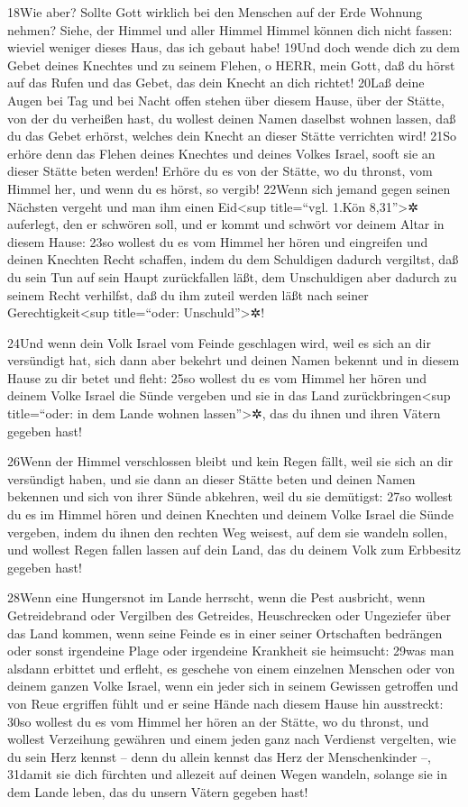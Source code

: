 18Wie aber? Sollte Gott wirklich bei den Menschen auf der Erde Wohnung
nehmen? Siehe, der Himmel und aller Himmel Himmel können dich nicht
fassen: wieviel weniger dieses Haus, das ich gebaut habe! 19Und doch
wende dich zu dem Gebet deines Knechtes und zu seinem Flehen, o HERR,
mein Gott, daß du hörst auf das Rufen und das Gebet, das dein Knecht an
dich richtet! 20Laß deine Augen bei Tag und bei Nacht offen stehen über
diesem Hause, über der Stätte, von der du verheißen hast, du wollest
deinen Namen daselbst wohnen lassen, daß du das Gebet erhörst, welches
dein Knecht an dieser Stätte verrichten wird! 21So erhöre denn das
Flehen deines Knechtes und deines Volkes Israel, sooft sie an dieser
Stätte beten werden! Erhöre du es von der Stätte, wo du thronst, vom
Himmel her, und wenn du es hörst, so vergib! 22Wenn sich jemand gegen
seinen Nächsten vergeht und man ihm einen Eid\textless sup title=``vgl.
1.Kön 8,31''\textgreater✲ auferlegt, den er schwören soll, und er kommt
und schwört vor deinem Altar in diesem Hause: 23so wollest du es vom
Himmel her hören und eingreifen und deinen Knechten Recht schaffen,
indem du dem Schuldigen dadurch vergiltst, daß du sein Tun auf sein
Haupt zurückfallen läßt, dem Unschuldigen aber dadurch zu seinem Recht
verhilfst, daß du ihm zuteil werden läßt nach seiner
Gerechtigkeit\textless sup title=``oder: Unschuld''\textgreater✲!

24Und wenn dein Volk Israel vom Feinde geschlagen wird, weil es sich an
dir versündigt hat, sich dann aber bekehrt und deinen Namen bekennt und
in diesem Hause zu dir betet und fleht: 25so wollest du es vom Himmel
her hören und deinem Volke Israel die Sünde vergeben und sie in das Land
zurückbringen\textless sup title=``oder: in dem Lande wohnen
lassen''\textgreater✲, das du ihnen und ihren Vätern gegeben hast!

26Wenn der Himmel verschlossen bleibt und kein Regen fällt, weil sie
sich an dir versündigt haben, und sie dann an dieser Stätte beten und
deinen Namen bekennen und sich von ihrer Sünde abkehren, weil du sie
demütigst: 27so wollest du es im Himmel hören und deinen Knechten und
deinem Volke Israel die Sünde vergeben, indem du ihnen den rechten Weg
weisest, auf dem sie wandeln sollen, und wollest Regen fallen lassen auf
dein Land, das du deinem Volk zum Erbbesitz gegeben hast!

28Wenn eine Hungersnot im Lande herrscht, wenn die Pest ausbricht, wenn
Getreidebrand oder Vergilben des Getreides, Heuschrecken oder Ungeziefer
über das Land kommen, wenn seine Feinde es in einer seiner Ortschaften
bedrängen oder sonst irgendeine Plage oder irgendeine Krankheit sie
heimsucht: 29was man alsdann erbittet und erfleht, es geschehe von einem
einzelnen Menschen oder von deinem ganzen Volke Israel, wenn ein jeder
sich in seinem Gewissen getroffen und von Reue ergriffen fühlt und er
seine Hände nach diesem Hause hin ausstreckt: 30so wollest du es vom
Himmel her hören an der Stätte, wo du thronst, und wollest Verzeihung
gewähren und einem jeden ganz nach Verdienst vergelten, wie du sein Herz
kennst -- denn du allein kennst das Herz der Menschenkinder --, 31damit
sie dich fürchten und allezeit auf deinen Wegen wandeln, solange sie in
dem Lande leben, das du unsern Vätern gegeben hast!

